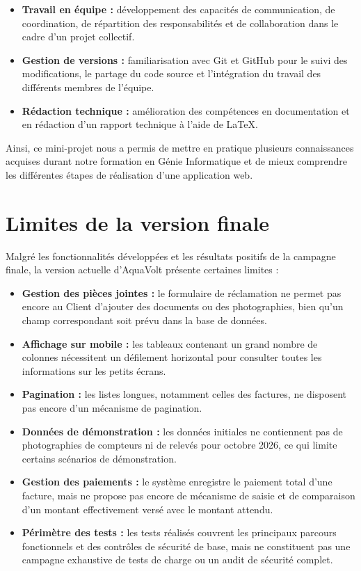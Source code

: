 \begin{itemize}
    \item \textbf{Travail en équipe :} développement des capacités de communication, de coordination, de répartition des responsabilités et de collaboration dans le cadre d'un projet collectif.

    \item \textbf{Gestion de versions :} familiarisation avec Git et GitHub pour le suivi des modifications, le partage du code source et l'intégration du travail des différents membres de l'équipe.

    \item \textbf{Rédaction technique :} amélioration des compétences en documentation et en rédaction d'un rapport technique à l'aide de LaTeX.
\end{itemize}

Ainsi, ce mini-projet nous a permis de mettre en pratique plusieurs connaissances acquises durant notre formation en Génie Informatique et de mieux comprendre les différentes étapes de réalisation d'une application web.

\section{Limites de la version finale}

Malgré les fonctionnalités développées et les résultats positifs de la campagne finale, la version actuelle d'AquaVolt présente certaines limites :

\begin{itemize}
    \item \textbf{Gestion des pièces jointes :} le formulaire de réclamation ne permet pas encore au Client d'ajouter des documents ou des photographies, bien qu'un champ correspondant soit prévu dans la base de données.

    \item \textbf{Affichage sur mobile :} les tableaux contenant un grand nombre de colonnes nécessitent un défilement horizontal pour consulter toutes les informations sur les petits écrans.

    \item \textbf{Pagination :} les listes longues, notamment celles des factures, ne disposent pas encore d'un mécanisme de pagination.

    \item \textbf{Données de démonstration :} les données initiales ne contiennent pas de photographies de compteurs ni de relevés pour octobre 2026, ce qui limite certains scénarios de démonstration.

    \item \textbf{Gestion des paiements :} le système enregistre le paiement total d'une facture, mais ne propose pas encore de mécanisme de saisie et de comparaison d'un montant effectivement versé avec le montant attendu.

    \item \textbf{Périmètre des tests :} les tests réalisés couvrent les principaux parcours fonctionnels et des contrôles de sécurité de base, mais ne constituent pas une campagne exhaustive de tests de charge ou un audit de sécurité complet.
\end{itemize}

